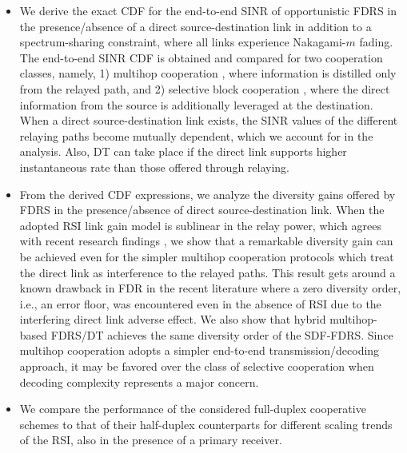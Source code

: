 \documentclass[10pt,journal]{IEEEtran}
\begin{document}
\begin{itemize}
\item We derive the exact \ac{CDF} for the end-to-end \ac{SINR} of opportunistic \ac{FDRS} in the presence/absence of a direct source-destination link in addition to a spectrum-sharing constraint, where all links experience Nakagami-$m$ fading. The end-to-end \ac{SINR} \ac{CDF} is obtained and compared for two cooperation classes, namely, 1) multihop cooperation \cite{TVT2010_DF_FDR_RSI_without_DL}, where information is distilled only from the relayed path, and 2) selective block cooperation \cite{6510556,2015XX_TWC_Khafagy_FDR,201602_IET_Wang_FDRS}, where the direct information from the source is additionally leveraged at the destination. When a direct source-destination link exists, the \ac{SINR} values of the different relaying paths become mutually dependent, which we account for in the analysis. Also, \ac{DT} can take place if the direct link supports higher instantaneous rate than those offered through relaying.
\item From the derived \ac{CDF} expressions, we analyze the diversity gains offered by \ac{FDRS} in the presence/absence of direct source-destination link. When the adopted \ac{RSI} link gain model is sublinear in the relay power, which agrees with recent research findings \cite{201308_SIGCOMM_FD_Radios,2015XX_TWC_Elsayed_FD1,2015XX_TWC_Elsayed_FD2}, we show that a remarkable diversity gain can be achieved even for the simpler multihop cooperation protocols which treat the direct link as interference to the relayed paths. This result gets around a known drawback in FDR in the recent literature where a zero diversity order, i.e., an error floor, was encountered even in the absence of \ac{RSI} due to the interfering direct link adverse effect. We also show that hybrid multihop-based \ac{FDRS}/\ac{DT} achieves the same diversity order of the \ac{SDF}-\ac{FDRS}. Since multihop cooperation adopts a simpler end-to-end transmission/decoding approach, it may be favored over the class of selective cooperation when decoding complexity represents a major concern.
\item We compare the performance of the considered full-duplex cooperative schemes to that of their half-duplex counterparts for different scaling trends of the \ac{RSI}, also in the presence of a primary receiver.
\end{itemize}
\end{document}
